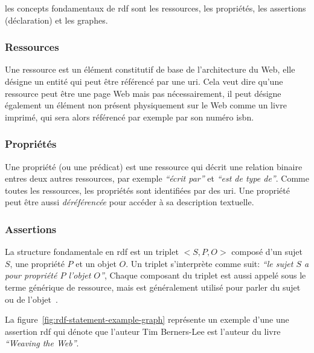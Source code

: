 les concepts fondamentaux de \acrshort{rdf} sont les ressources, les
propriétés, les assertions (déclaration) et les graphes.

\subsubsection{Ressources}
\label{sec:semantic-web-rdf-rdf-resources}

Une ressource est un élément constitutif de base de l'architecture du
Web, elle désigne un entité qui peut être référencé par une
\acrshort{uri}. Cela veut dire qu'une ressource peut être une page Web
mais pas nécessairement, il peut désigne également un élément non
présent physiquement sur le Web comme un livre imprimé, qui sera alors
référencé par exemple par son numéro \acrshort{isbn}.

\subsubsection{Propriétés}
\label{sec:semantic-web-rdf-rdf-properties}

Une propriété (ou une prédicat) est une ressource qui décrit une
relation binaire entres deux autres ressources, par exemple
\emph{``écrit par''} et \emph{``est de type de''}. Comme toutes les
ressources, les propriétés sont identifiées par des
\acrshort{uri}. Une propriété peut être aussi \emph{déréférencée} pour
accéder à sa description textuelle.

\subsubsection{Assertions}
\label{sec:semantic-web-rdf-rdf-statements}

La structure fondamentale en \acrshort{rdf} est un triplet $<S,P,O>$
composé d'un sujet $S$, une propriété $P$ et un objet $O$. Un triplet
s'interprète comme suit: \emph{``le sujet $S$ a pour propriété $P$
  l'objet $O$''}, Chaque composant du triplet est aussi appelé sous le
terme générique de ressource, mais est généralement utilisé pour
parler du sujet ou de l'objet~\cite{antoniou2012semantic}.\medskip



La figure~\ref{fig:rdf-statement-example-graph} représente un exemple
d'une une assertion \acrshort{rdf} qui dénote que l'auteur Tim
Berners-Lee est l'auteur du livre \emph{``Weaving the Web''}.\medskip


